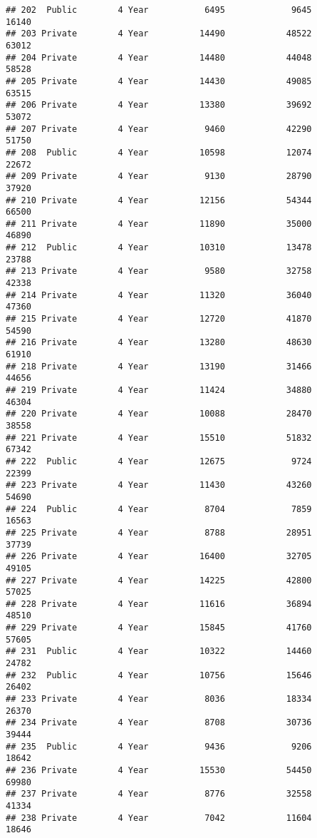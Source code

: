 \documentclass[
]{article}
\begin{document}
\begin{verbatim}
## 202  Public        4 Year           6495             9645          16140
## 203 Private        4 Year          14490            48522          63012
## 204 Private        4 Year          14480            44048          58528
## 205 Private        4 Year          14430            49085          63515
## 206 Private        4 Year          13380            39692          53072
## 207 Private        4 Year           9460            42290          51750
## 208  Public        4 Year          10598            12074          22672
## 209 Private        4 Year           9130            28790          37920
## 210 Private        4 Year          12156            54344          66500
## 211 Private        4 Year          11890            35000          46890
## 212  Public        4 Year          10310            13478          23788
## 213 Private        4 Year           9580            32758          42338
## 214 Private        4 Year          11320            36040          47360
## 215 Private        4 Year          12720            41870          54590
## 216 Private        4 Year          13280            48630          61910
## 218 Private        4 Year          13190            31466          44656
## 219 Private        4 Year          11424            34880          46304
## 220 Private        4 Year          10088            28470          38558
## 221 Private        4 Year          15510            51832          67342
## 222  Public        4 Year          12675             9724          22399
## 223 Private        4 Year          11430            43260          54690
## 224  Public        4 Year           8704             7859          16563
## 225 Private        4 Year           8788            28951          37739
## 226 Private        4 Year          16400            32705          49105
## 227 Private        4 Year          14225            42800          57025
## 228 Private        4 Year          11616            36894          48510
## 229 Private        4 Year          15845            41760          57605
## 231  Public        4 Year          10322            14460          24782
## 232  Public        4 Year          10756            15646          26402
## 233 Private        4 Year           8036            18334          26370
## 234 Private        4 Year           8708            30736          39444
## 235  Public        4 Year           9436             9206          18642
## 236 Private        4 Year          15530            54450          69980
## 237 Private        4 Year           8776            32558          41334
## 238 Private        4 Year           7042            11604          18646

\end{verbatim}
\end{document}
